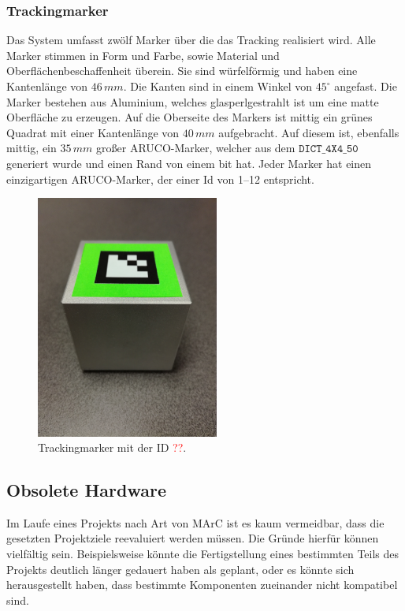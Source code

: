 \subsubsection{Trackingmarker}
Das System umfasst zwölf Marker über die das Tracking realisiert wird. Alle Marker stimmen in Form und Farbe, sowie Material und Oberflächenbeschaffenheit überein. Sie sind würfelförmig und haben eine Kantenlänge von $46\,mm$. Die Kanten sind in einem Winkel von $45^\circ$ angefast. Die Marker bestehen aus Aluminium, welches glasperlgestrahlt ist um eine matte Oberfläche zu erzeugen. Auf die Oberseite des Markers ist mittig ein grünes Quadrat mit einer Kantenlänge von $40\,mm$ aufgebracht. Auf diesem ist, ebenfalls mittig, ein $35\,mm$ großer ARUCO-Marker, welcher aus dem $\texttt{DICT\_4X4\_50}$ generiert wurde und einen Rand von einem bit hat. Jeder Marker hat einen einzigartigen ARUCO-Marker, der einer Id von 1--12 entspricht.


	\begin{figure}[H]
		\center 
		\includegraphics[trim = 0mm 280mm 0mm 150mm, clip, width=6cm]{Bilder/tracking-marker.jpg}			
			\caption{Trackingmarker mit der ID \textcolor{red}{??}.}
			\label{fig:marker}
	\end{figure}
	
\subsection{Obsolete Hardware}\label{sec:obsoleteHardware}
Im Laufe eines Projekts nach Art von MArC ist es kaum vermeidbar, dass die gesetzten Projektziele reevaluiert werden müssen. Die Gründe hierfür können vielfältig sein. Beispielsweise könnte die Fertigstellung eines bestimmten Teils des Projekts deutlich länger gedauert haben als geplant, oder es könnte sich herausgestellt haben, dass bestimmte Komponenten zueinander nicht kompatibel sind.

